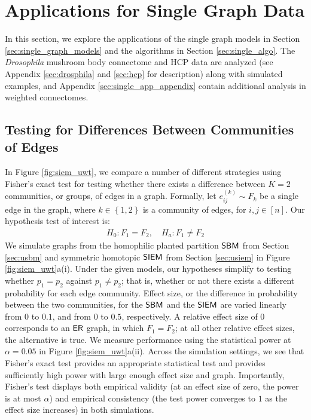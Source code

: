 \section{Applications for Single Graph Data}\label{sec:single_app}
In this section, we explore the applications of the single graph models in Section \ref{sec:single_graph_models} and the algorithms in Section \ref{sec:single_algo}. The \textit{Drosophila} mushroom body connectome and HCP data are analyzed (see Appendix \ref{sec:drosphila} and \ref{sec:hcp} for description) along with simulated examples, and Appendix \ref{sec:single_app_appendix} contain additional analysis in weighted connectomes. 

\subsection{Testing for Differences Between Communities of Edges}
\label{sec:sg_dros_siem}

In Figure \ref{fig:siem_uwt}, we compare a number of different strategies using Fisher's exact test \cite{fisher1925statistical} for testing whether there exists a difference between $K=2$ communities, or groups, of edges in a graph. Formally, let $e_{ij}^{(k)} \sim F_k$ be a single edge in the graph, where $k \in\left\{ 1, 2\right\}$ is a community of edges, for $i, j \in [n]$. Our hypothesis test of interest is:
\begin{align*}
    H_0: F_1 = F_2, \quad
    H_a: F_1 \neq F_2
\end{align*}
We simulate graphs from the homophilic planted partition $\operatorname{\mathsf{SBM}}$  from Section \ref{sec:usbm} and symmetric homotopic $\operatorname{\mathsf{SIEM}}$ from Section \ref{sec:usiem} in Figure \ref{fig:siem_uwt}a(i). Under the given models, our hypotheses simplify to testing whether $p_1 = p_2$ against $p_1 \neq p_2$; that is, whether or not there exists a different probability for each edge community. Effect size, or the difference in probability between the two communities, for the $\operatorname{\mathsf{SBM}}$ and the $\operatorname{\mathsf{SIEM}}$ are varied linearly from $0$ to $0.1$, and from $0$ to $0.5$, respectively. 
A relative effect size of $0$ corresponds to an $\operatorname{\mathsf{ER}}$ graph, in which $F_1 = F_2$; at all other relative effect sizes, the alternative is true. We measure performance using the statistical power at $\alpha = 0.05$ in Figure \ref{fig:siem_uwt}a(ii). Across the simulation settings, we see that Fisher's exact test provides an appropriate statistical test and provides sufficiently high  power with large enough effect size and graph. Importantly, Fisher's test displays  both empirical validity (at an effect size of zero, the power is at most $\alpha$) and empirical consistency (the test power converges to $1$ as the effect size increases) in both simulations.

